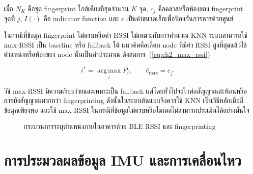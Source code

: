 เมื่อ $N_K$ คือชุด fingerprint ใกล้เคียงที่สุดจำนวน $K$ จุด, $c_j$ คือคลาสหรือห้องของ fingerprint จุดที่ $j$, $I(\cdot)$ คือ indicator function และ $\epsilon$ เป็นค่าขนาดเล็กเพื่อป้องกันการหารด้วยศูนย์

ในกรณีที่ข้อมูล fingerprint ไม่ครบหรือค่า RSSI ไม่เหมาะกับการคำนวณ KNN ระบบสามารถใช้ max-RSSI เป็น baseline หรือ fallback ได้ แนวคิดคือเลือก node ที่มีค่า RSSI สูงที่สุดแล้วใช้ตำแหน่งหรือห้องของ node นั้นเป็นค่าประมาณ ดังสมการ~(\ref{eq:ch2_max_rssi})

\begin{equation}
    i^{*} = \operatorname*{arg\,max}_{i} P_i, \qquad
    \hat{c}_{\mathrm{max}} = c_{i^{*}}
    \label{eq:ch2_max_rssi}
\end{equation}

วิธี max-RSSI มีความเรียบง่ายและเหมาะเป็น fallback แต่โดยทั่วไปจะไวต่อสัญญาณสะท้อนหรือการบังสัญญาณมากกว่า fingerprinting ดังนั้นในระบบต้นแบบจึงควรใช้ KNN เป็นวิธีหลักเมื่อมีข้อมูลเพียงพอ และใช้ max-RSSI ในกรณีที่ข้อมูลไม่ครบหรือโมเดลไม่สามารถประเมินได้อย่างมั่นใจ

\begin{figure}[htbp]
    \centering
    \caption{กระบวนการระบุตำแหน่งภายในอาคารด้วย BLE RSSI และ fingerprinting}
    \label{fig:ch2_ble_fingerprinting_pipeline}
\end{figure}

\section{การประมวลผลข้อมูล IMU และการเคลื่อนไหว}
\label{sec:ch2_imu_processing}

